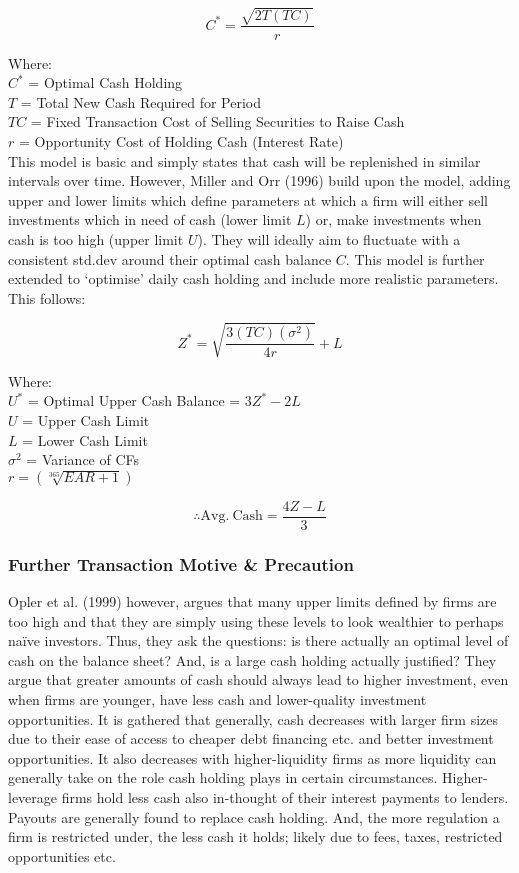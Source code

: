 \documentclass[11pt, english]{article}
\begin{document}
	$$C^*=\frac{\sqrt{2T(TC)}}{r}$$

	Where:\\
	$C^*$ = Optimal Cash Holding\\
	$T$ = Total New Cash Required for Period\\
	$TC$ = Fixed Transaction Cost of Selling Securities to Raise Cash\\
	$r$ = Opportunity Cost of Holding Cash (Interest Rate)\\

	This model is basic and simply states that cash will be replenished in similar intervals over time. However, Miller and Orr (1996) build upon the model, adding upper and lower limits which define parameters at which a firm will either sell investments which in need of cash (lower limit $L$) or, make investments when cash is too high (upper limit $U$). They will ideally aim to fluctuate with a consistent std.dev around their optimal cash balance $C$. This model is further extended to ‘optimise’ daily cash holding and include more realistic parameters. This follows:

	$$Z^*=\sqrt{\frac{3(TC)(\sigma^2)}{4r}}+L$$

	Where:\\
	$U^*$ = Optimal Upper Cash Balance = $3Z^*-2L$\\
	$U$ = Upper Cash Limit\\
	$L$ = Lower Cash Limit\\
	$\sigma^2$ = Variance of CFs\\
	$r=\left(\sqrt[365]{EAR+1}\right)$

	$$\therefore\mathrm{Avg.\ Cash}=\frac{4Z-L}{3}$$

		\subsubsection*{Further Transaction Motive \& Precaution}

	Opler et al. (1999) however, argues that many upper limits defined by firms are too high and that they are simply using these levels to look wealthier to perhaps naïve investors. Thus, they ask the questions: is there actually an optimal level of cash on the balance sheet? And, is a large cash holding actually justified? They argue that greater amounts of cash should always lead to higher investment, even when firms are younger, have less cash and lower-quality investment opportunities. It is gathered that generally, cash decreases with larger firm sizes due to their ease of access to cheaper debt financing etc. and better investment opportunities. It also decreases with higher-liquidity firms as more liquidity can generally take on the role cash holding plays in certain circumstances. Higher- leverage firms hold less cash also in-thought of their interest payments to lenders. Payouts are generally found to replace cash holding. And, the more regulation a firm is restricted under, the less cash it holds; likely due to fees, taxes, restricted opportunities etc.\\
\end{document}
